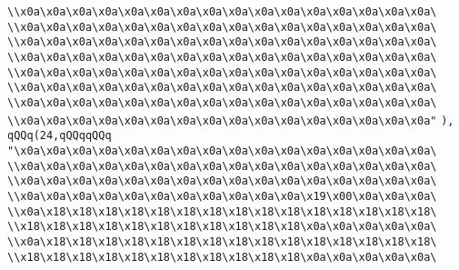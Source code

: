 \verb|\\x0a\x0a\x0a\x0a\x0a\x0a\x0a\x0a\x0a\x0a\x0a\x0a\x0a\x0a\x0a\x0a\|\newline
\verb|\\x0a\x0a\x0a\x0a\x0a\x0a\x0a\x0a\x0a\x0a\x0a\x0a\x0a\x0a\x0a\x0a\|\newline
\verb|\\x0a\x0a\x0a\x0a\x0a\x0a\x0a\x0a\x0a\x0a\x0a\x0a\x0a\x0a\x0a\x0a\|\newline
\verb|\\x0a\x0a\x0a\x0a\x0a\x0a\x0a\x0a\x0a\x0a\x0a\x0a\x0a\x0a\x0a\x0a\|\newline
\verb|\\x0a\x0a\x0a\x0a\x0a\x0a\x0a\x0a\x0a\x0a\x0a\x0a\x0a\x0a\x0a\x0a\|\newline
\verb|\\x0a\x0a\x0a\x0a\x0a\x0a\x0a\x0a\x0a\x0a\x0a\x0a\x0a\x0a\x0a\x0a\|\newline
\verb|\\x0a\x0a\x0a\x0a\x0a\x0a\x0a\x0a\x0a\x0a\x0a\x0a\x0a\x0a\x0a\x0a\|\newline
\verb|\\x0a\x0a\x0a\x0a\x0a\x0a\x0a\x0a\x0a\x0a\x0a\x0a\x0a\x0a\x0a\x0a"|\newline
\verb|),|\newline
\verb|qQQq(24,qQQqqQQq|\newline
\verb|"\x0a\x0a\x0a\x0a\x0a\x0a\x0a\x0a\x0a\x0a\x0a\x0a\x0a\x0a\x0a\x0a\|\newline
\verb|\\x0a\x0a\x0a\x0a\x0a\x0a\x0a\x0a\x0a\x0a\x0a\x0a\x0a\x0a\x0a\x0a\|\newline
\verb|\\x0a\x0a\x0a\x0a\x0a\x0a\x0a\x0a\x0a\x0a\x0a\x0a\x0a\x0a\x0a\x0a\|\newline
\verb|\\x0a\x0a\x0a\x0a\x0a\x0a\x0a\x0a\x0a\x0a\x0a\x19\x00\x0a\x0a\x0a\|\newline
\verb|\\x0a\x18\x18\x18\x18\x18\x18\x18\x18\x18\x18\x18\x18\x18\x18\x18\|\newline
\verb|\\x18\x18\x18\x18\x18\x18\x18\x18\x18\x18\x18\x0a\x0a\x0a\x0a\x0a\|\newline
\verb|\\x0a\x18\x18\x18\x18\x18\x18\x18\x18\x18\x18\x18\x18\x18\x18\x18\|\newline
\verb|\\x18\x18\x18\x18\x18\x18\x18\x18\x18\x18\x18\x0a\x0a\x0a\x0a\x0a\|\newline
